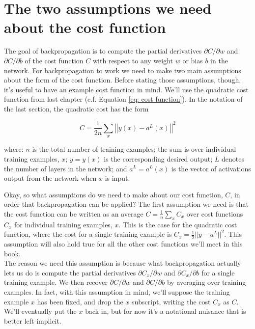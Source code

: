 \section{The two assumptions we need about the cost function}
\label{sec: The two assumptions we need about the cost function}

The goal of backpropagation is to compute the partial derivatives $\partial C/\partial w$ and $\partial C/\partial b$ of the cost function $C$ with respect to any weight $w$ or bias $b$ in the network. For backpropagation to work we need to make two main assumptions about the form of the cost function. Before stating those assumptions, though, it's useful to have an example cost function in mind. We'll use the quadratic cost function from last chapter (c.f. Equation \ref{eq: cost function}). In the notation of the last section, the quadratic cost has the form

\begin{equation}
C= \frac{1}{2n}\sum_x\left|\left|y(x)-a^L(x)\right|\right|^2
\label{eq: cost function for L output}
\end{equation}

where: $n$ is the total number of training examples; the sum is over individual training examples, $x$; $y=y(x)$ is the corresponding desired output; $L$ denotes the number of layers in the network; and $a^L=a^L(x)$ is the vector of activations output from the network when $x$ is input.

Okay, so what assumptions do we need to make about our cost function, $C$, in order that backpropagation can be applied? The first assumption we need is that the cost function can be written as an average $C=\frac{1}{n}\sum_x C_x$ over cost functions $C_x$ for individual training examples, $x$. This is the case for the quadratic cost function, where the cost for a single training example is $C_x=\frac{1}{2}||y-a^L||^2$. This assumption will also hold true for all the other cost functions we'll meet in this book.\\

The reason we need this assumption is because what backpropagation actually lets us do is compute the partial derivatives $\partial C_x/\partial w$ and $\partial C_x/\partial b$ for a single training example. We then recover $\partial C/\partial w$ and $\partial C/\partial b$ by averaging over training examples. In fact, with this assumption in mind, we'll suppose the training example $x$ has been fixed, and drop the $x$ subscript, writing the cost $C_x$ as $C$. We'll eventually put the $x$ back in, but for now it's a notational nuisance that is better left implicit.\\

